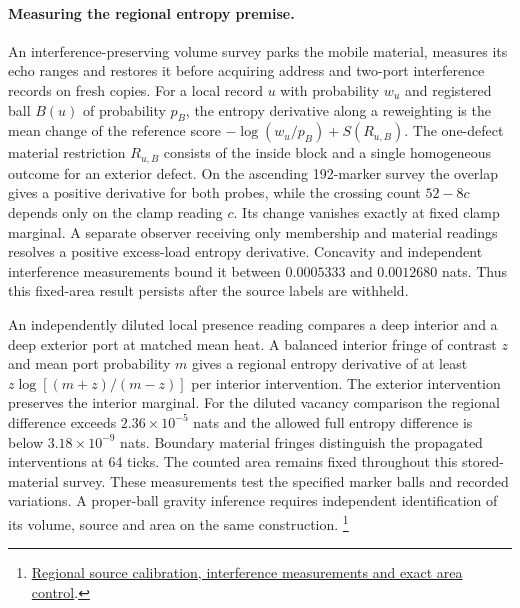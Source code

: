 \documentclass[11pt]{article}
\begin{document}
\paragraph{Measuring the regional entropy premise.}
An interference-preserving volume survey parks the mobile material,
measures its echo ranges and restores it before acquiring address and
two-port interference records on fresh copies. For a local record $u$
with probability $w_u$ and registered ball $B(u)$ of probability $p_B$,
the entropy derivative along a reweighting is the mean change of the
reference score $-\log(w_u/p_B)+S(R_{u,B})$. The one-defect material
restriction $R_{u,B}$ consists of the inside block and a single
homogeneous outcome for an exterior defect. On the ascending 192-marker
survey the overlap gives a positive derivative for both probes, while
the crossing count $52-8c$ depends only on the clamp reading $c$.
Its change vanishes exactly at fixed clamp marginal. A separate observer
receiving only membership and material readings resolves a positive
excess-load entropy derivative. Concavity and independent interference
measurements bound it between $0.0005333$ and $0.0012680$ nats. Thus this
fixed-area result persists after the source labels are withheld.

An independently diluted local presence reading compares a deep interior
and a deep exterior port at matched mean heat. A balanced interior
fringe of contrast $z$ and mean port probability $m$ gives a regional
entropy derivative of at least $z\log[(m+z)/(m-z)]$ per interior
intervention. The exterior intervention preserves the interior marginal.
For the diluted vacancy comparison the regional difference exceeds
$2.36\times10^{-5}$ nats and the allowed full entropy difference is
below $3.18\times10^{-9}$ nats. Boundary material fringes distinguish
the propagated interventions at 64 ticks. The counted area remains fixed
throughout this stored-material survey. These measurements test the
specified marker balls and recorded variations. A proper-ball gravity
inference requires independent identification of its volume, source and
area on the same construction.%
\footnote{\href{https://github.com/FloatingPragma/observer-patch-holography/blob/main/model/experiments/interval_echo_shell_flux/product_address/green_response/material_recoil/overlap_source/native_boundary/stock/aperture/COHERENT_RESULTS.md}{Regional source calibration, interference measurements and exact area control}.}
\end{document}
